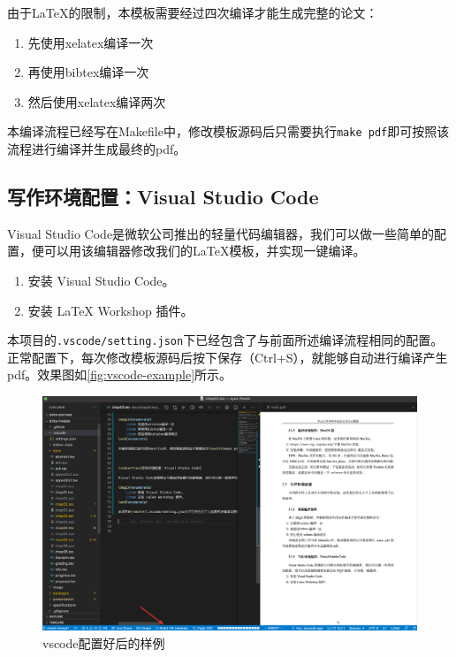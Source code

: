 由于\LaTeX 的限制，本模板需要经过四次编译才能生成完整的论文：

\begin{enumerate}
    \item 先使用xelatex编译一次
    \item 再使用bibtex编译一次
    \item 然后使用xelatex编译两次
\end{enumerate}

本编译流程已经写在Makefile中，修改模板源码后只需要执行\texttt{make pdf}即可按照该流程进行编译并生成最终的pdf。



\subsection{写作环境配置：Visual Studio Code}

Visual Studio Code是微软公司推出的轻量代码编辑器，我们可以做一些简单的配置，便可以用该编辑器修改我们的\LaTeX 模板，并实现一键编译。

\begin{enumerate}
    \item 安装 Visual Studio Code。
    \item 安装 LaTeX Workshop 插件。
\end{enumerate}

本项目的\texttt{.vscode/setting.json}下已经包含了与前面所述编译流程相同的配置。正常配置下，每次修改模板源码后按下保存（Ctrl+S），就能够自动进行编译产生pdf。效果图如\autoref{fig:vscode-example}所示。


\begin{figure}[h]
	\centering
	\includegraphics[width=\linewidth]{image/chap03/vscode-example.png}
	\caption{vscode配置好后的样例}
 	\label{fig:vscode-example}
\end{figure}


